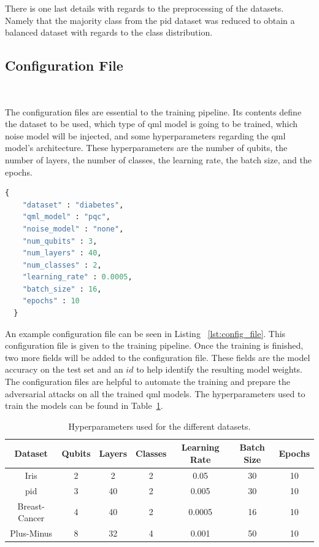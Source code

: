 There is one last details with regards to the preprocessing
of the datasets. Namely that the majority class from the
\ac{pid} dataset was reduced to obtain a balanced dataset
with regards to the class distribution. \

\subsection{Configuration File}\label{subsection:config} \

The configuration files are essential to the training
pipeline. Its contents define the dataset to be used,
which type of \ac{qml} model is going to be trained,
which noise model will be injected, and some hyperparameters
regarding the \ac{qml} model's architecture. These hyperparameters
are the number of qubits, the number of layers, the number of
classes, the learning rate, the batch size, and the epochs. \

\begin{lstlisting}[language=Python, caption={Example configuration file.}, label=lst:config_file]
  {
    "dataset" : "diabetes",
    "qml_model" : "pqc",
    "noise_model" : "none",
    "num_qubits" : 3,
    "num_layers" : 40,
    "num_classes" : 2,
    "learning_rate" : 0.0005,
    "batch_size" : 16,
    "epochs" : 10
  }
\end{lstlisting}

An example configuration file can be seen in Listing
~\ref{lst:config_file}. This configuration file is given
to the training pipeline. Once the training is finished,
two more fields will be added to the configuration file.
These fields are the model accuracy on the test set and an
\(id\) to help identify the resulting model weights. The
configuration files are helpful to automate the training
and prepare the adversarial attacks on all the trained
\ac{qml} models. The hyperparameters used to train the
models can be found in Table~\ref{tab:hyperparameters}. \

\begin{table}[htpb]
  \centering
  \begin{tabular}{| c | c | c | c | c | c | c |}
    \hline
    Dataset & Qubits & Layers & Classes & Learning Rate & Batch Size & Epochs \\
    \hline
    Iris & 2 & 2 & 2 & 0.05 & 30 & 10 \\
    \hline
    \ac{pid} & 3 & 40 & 2 & 0.005 & 30 & 10 \\
    \hline
    Breast-Cancer & 4 & 40 & 2 & 0.0005 & 16 & 10 \\
    \hline
    Plus-Minus & 8 & 32 & 4 & 0.001 & 50 & 10 \\
    \hline
  \end{tabular}
  \caption[Hyperparameters table.]{Hyperparameters used for the different datasets.}\label{tab:hyperparameters}
\end{table}

